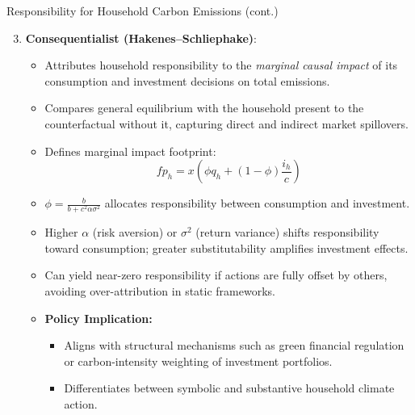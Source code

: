 \documentclass{beamer}
\begin{document}
\begin{frame}{Responsibility for Household Carbon Emissions (cont.)}
\footnotesize
\vspace{-3.0em}
\begin{enumerate}
  \setcounter{enumi}{2}
  \item \textbf{Consequentialist (Hakenes–Schliephake)}:
    \begin{itemize}
      \footnotesize
      \item Attributes household responsibility to the \textit{marginal causal impact} of its consumption and investment decisions on total emissions.
      \item Compares general equilibrium with the household present to the counterfactual without it, capturing direct and indirect market spillovers.
      \item Defines marginal impact footprint:
      \[
        fp_h = x \left( \phi q_h + (1-\phi)\frac{i_h}{c} \right)
      \]
      \item $\phi = \frac{b}{b + c^2 \alpha \sigma^2}$ allocates responsibility between consumption and investment.
      \item Higher $\alpha$ (risk aversion) or $\sigma^2$ (return variance) shifts responsibility toward consumption; greater substitutability amplifies investment effects.
      \item Can yield near-zero responsibility if actions are fully offset by others, avoiding over-attribution in static frameworks.
      \item \textbf{Policy Implication:}
        \begin{itemize}
          \item Aligns with structural mechanisms such as green financial regulation or carbon-intensity weighting of investment portfolios.
          \item Differentiates between symbolic and substantive household climate action.
        \end{itemize}
    \end{itemize}
\end{enumerate}
\end{frame}
\end{document}
